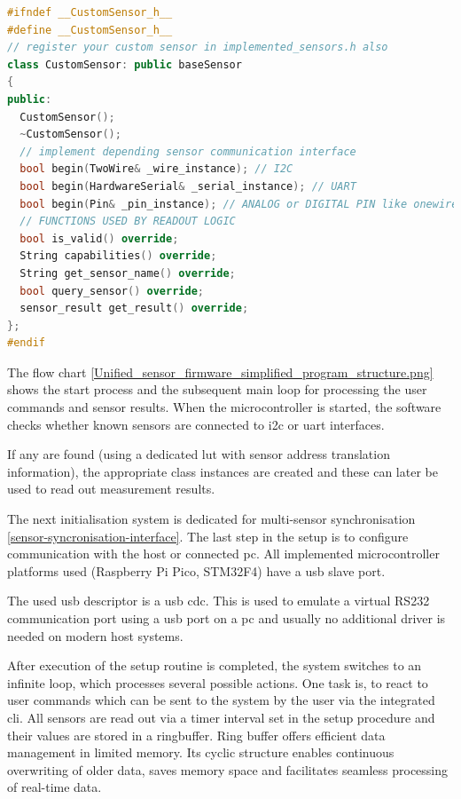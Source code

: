 \begin{lstlisting}[language={C++}, caption={CustomSensor-Class for adding new sensor hardware support}, label=lst:CustomSensorClass]
#ifndef __CustomSensor_h__
#define __CustomSensor_h__
// register your custom sensor in implemented_sensors.h also
class CustomSensor: public baseSensor
{
public:
  CustomSensor();
  ~CustomSensor();
  // implement depending sensor communication interface
  bool begin(TwoWire& _wire_instance); // I2C
  bool begin(HardwareSerial& _serial_instance); // UART
  bool begin(Pin& _pin_instance); // ANALOG or DIGITAL PIN like onewire
  // FUNCTIONS USED BY READOUT LOGIC
  bool is_valid() override;
  String capabilities() override;
  String get_sensor_name() override;
  bool query_sensor() override;
  sensor_result get_result() override;        
};
#endif
\end{lstlisting}

The flow chart
\ref{Unified_sensor_firmware_simplified_program_structure.png} shows the
start process and the subsequent main loop for processing the user
commands and sensor results. When the microcontroller is started, the
software checks whether known sensors are connected to \gls{i2c} or
\gls{uart} interfaces.

If any are found (using a dedicated \gls{lut} with sensor address
translation information), the appropriate class instances are created
and these can later be used to read out measurement results.

The next initialisation system is dedicated for multi-sensor
synchronisation \ref{sensor-syncronisation-interface}. The last step in
the setup is to configure communication with the host or connected
\gls{pc}. All implemented microcontroller platforms used (Raspberry Pi
Pico, STM32F4) have a \gls{usb} slave port.

The used usb descriptor is a \gls{usb} \gls{cdc}. This is used to
emulate a virtual RS232 communication port using a \gls{usb} port on a
\gls{pc} and usually no additional driver is needed on modern host
systems.

After execution of the setup routine is completed, the system switches
to an infinite loop, which processes several possible actions. One task
is, to react to user commands which can be sent to the system by the
user via the integrated \gls{cli}. All sensors are read out via a timer
interval set in the setup procedure and their values are stored in a
ringbuffer. Ring buffer offers efficient data management in limited
memory. Its cyclic structure enables continuous overwriting of older
data, saves memory space and facilitates seamless processing of
real-time data.

